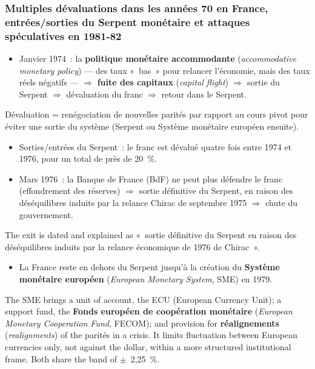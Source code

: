 \subsubsection{Multiples dévaluations dans les années 70 en France, entrées/sorties du Serpent monétaire et attaques spéculatives en 1981-82}

\begin{itemize}
  \item Janvier 1974~: la \textbf{politique monétaire accommodante}
    (\textit{accommodative monetary policy}) --- des taux «~bas~» pour relancer
    l'économie, mais des taux réels négatifs --- $\Rightarrow$ \textbf{fuite des
    capitaux} (\textit{capital flight}) $\Rightarrow$ sortie du Serpent $\Rightarrow$
    dévaluation du franc $\Rightarrow$ retour dans le Serpent.
\end{itemize}

\begin{definition}[Dévaluation]
  Dévaluation = renégociation de nouvelles parités par rapport au cours pivot pour
  éviter une sortie du système (Serpent ou Système monétaire européen ensuite).
\end{definition}

\begin{itemize}
  \item Sorties/entrées du Serpent~: le franc est dévalué quatre fois entre 1974 et
    1976, pour un total de près de 20~\%.
  \item Mars 1976~: la Banque de France (BdF) ne peut plus défendre le franc
    (effondrement des réserves) $\Rightarrow$ sortie définitive du Serpent, en raison
    des déséquilibres induits par la relance Chirac de septembre 1975
    $\Rightarrow$ chute du gouvernement.
\end{itemize}

\begin{remark}
  The exit is dated and explained as «~sortie définitive du Serpent en raison des
  déséquilibres induits par la relance économique de 1976 de Chirac~».
\end{remark}

\begin{itemize}
  \item La France reste en dehors du Serpent jusqu'à la création du \textbf{Système
    monétaire européen} (\textit{European Monetary System}, SME) en 1979.
\end{itemize}

The SME brings a unit of account, the ECU (European Currency Unit); a support fund, the
\textbf{Fonds européen de coopération monétaire} (\textit{European Monetary
Cooperation Fund}, FECOM); and provision for \textbf{réalignements} (\textit{realignments}) of
the parités in a crisis. It limits fluctuation between European currencies only, not
against the dollar, within a more structured institutional frame. Both share the band of
$\pm$~2,25~\%.

